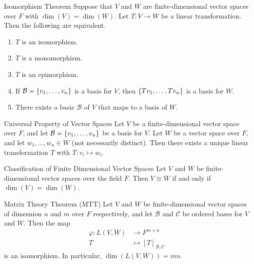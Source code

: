 \documentclass[class=article, crop=false]{standalone}
\begin{document}
  \begin{theorem}{Isomorphism Theorem}
    Suppose that $V$ and $W$ are finite-dimensional vector spaces over $F$ with $\dim(V) = \dim(W)$. Let $T\colon V\to W$ be a linear transformation. Then the following are equivalent.
    \begin{enumerate}[label=(\alph*)]
      \item $T$ is an isomorphism.
      \item $T$ is a monomorphism.
      \item $T$ is an epimorphism.
      \item If $\mathcal{B} = \left\{v_1, \dotsc, v_n\right\}$ is a basis for $V$, then $\left\{Tv_1, \dotsc,Tv_n\right\}$ is a basis for $W$.
      \item There exists a basis $\mathcal{B}$ of $V$ that maps to a basis of $W$.
    \end{enumerate}
  \end{theorem}
  \begin{theorem}{Universal Property of Vector Spaces}
    Let $V$ be a finite-dimensional vector space over $F$, and let $\mathcal{B} = \left\{v_1, \dotsc,v_n\right\}$ be a basis for $V$. Let $W$ be a vector space over $F$, and let $w_1,\dotsc,w_n\in W$ (not necessarily distinct). Then there exists a unique linear transformation $T$ with $T\colon v_i\mapsto w_i$.
  \end{theorem}
  \begin{theorem}{Classification of Finite Dimensional Vector Spaces}
    Let $V$ and $W$ be finite-dimensional vector spaces over the field $F$. Then $V\cong W$ if and only if $\dim(V) = \dim(W)$.
  \end{theorem}
  \begin{theorem}{Matrix Theory Theorem (MTT)}
    Let $V$ and $W$ be finite-dimensional vector spaces of dimesnion $n$ and $m$ over $F$ respectively, and let $\mathcal{B}$ and $\mathcal{C}$ be ordered bases for $V$ and $W$. Then the map
    \begin{align*}
      \varphi\colon L(V, W)&\to F^{m\times n} \\
      T &\mapsto [T]_{\mathcal{B},\mathcal{C}}
    \end{align*}
    is an isomorphism. In particular, $\dim(L(V,W)) = mn$.
  \end{theorem}
\end{document}
